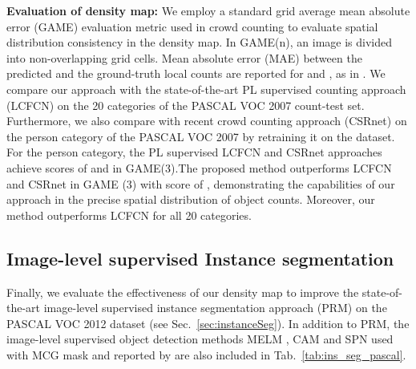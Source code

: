 \documentclass[10pt,twocolumn,letterpaper]{article}
\begin{document}
 
 


\noindent\textbf{Evaluation of density map:}
We employ a standard grid average mean absolute error (GAME) evaluation metric \cite{GAME} used in crowd counting to evaluate spatial distribution consistency in the density map. In GAME(n), an image is divided into  non-overlapping grid cells. Mean absolute error (MAE) between the predicted  and the  ground-truth local counts are reported for   and , as in \cite{GAME}.  We compare our approach with the state-of-the-art PL supervised counting approach (LCFCN) \cite{WhereAreBlobsECCV18} on the 20 categories of the PASCAL VOC 2007 count-test set. Furthermore, we also compare with recent crowd counting approach (CSRnet) \cite{CSRnetDialatedConv_2018_CVPR} on the person category of the PASCAL VOC 2007 by retraining it on the dataset. For the person category, the PL supervised LCFCN and CSRnet approaches achieve scores of  and  in GAME(3).The proposed method outperforms LCFCN and CSRnet in GAME (3) with score of , demonstrating the capabilities of our approach in the precise spatial distribution of object counts. Moreover, our method outperforms LCFCN for all 20 categories.




















\subsection{Image-level supervised Instance segmentation}
 \vspace{-0.15cm}
 Finally, we evaluate the effectiveness of our density map to improve the state-of-the-art image-level supervised instance segmentation approach (PRM)  \cite{PRM}  on the PASCAL VOC 2012  dataset (see Sec.~\ref{sec:instanceSeg}). In addition to PRM, the image-level  supervised object detection methods MELM \cite{melm_18}, CAM \cite{CAM} and SPN \cite{spn_iccv2017} used with  MCG mask  and reported by \cite{PRM} are also included in 
 Tab.~\ref{tab:ins_seg_pascal}. 
 
\end{document}
